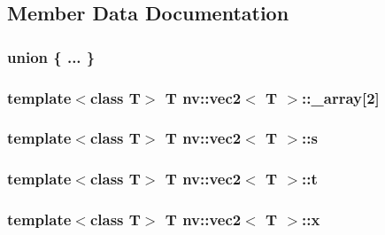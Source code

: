 \subsection{Member Data Documentation}
\hypertarget{classnv_1_1vec2_47919dfbe74f635507cd8ff2c33b06b6}{
\subsubsection[{"@7}]{\setlength{\rightskip}{0pt plus 5cm}union \{ ... \} }}
\label{classnv_1_1vec2_47919dfbe74f635507cd8ff2c33b06b6}


\hypertarget{classnv_1_1vec2_6bd8aa4685ee3e0b042c22572da5a3ff}{
\subsubsection[{\_\-array}]{\setlength{\rightskip}{0pt plus 5cm}template$<$class T$>$ T {\bf nv::vec2}$<$ T $>$::{\bf \_\-array}\mbox{[}2\mbox{]}}}
\label{classnv_1_1vec2_6bd8aa4685ee3e0b042c22572da5a3ff}


\hypertarget{classnv_1_1vec2_8654481c6586b16f5210f6cc0f04672e}{
\subsubsection[{s}]{\setlength{\rightskip}{0pt plus 5cm}template$<$class T$>$ T {\bf nv::vec2}$<$ T $>$::{\bf s}}}
\label{classnv_1_1vec2_8654481c6586b16f5210f6cc0f04672e}


\hypertarget{classnv_1_1vec2_6e3af4948e5eb30ffb805b88dd73cc91}{
\subsubsection[{t}]{\setlength{\rightskip}{0pt plus 5cm}template$<$class T$>$ T {\bf nv::vec2}$<$ T $>$::{\bf t}}}
\label{classnv_1_1vec2_6e3af4948e5eb30ffb805b88dd73cc91}


\hypertarget{classnv_1_1vec2_8efadb63b4a29541308b816916d1cb6f}{
\subsubsection[{x}]{\setlength{\rightskip}{0pt plus 5cm}template$<$class T$>$ T {\bf nv::vec2}$<$ T $>$::{\bf x}}}
\label{classnv_1_1vec2_8efadb63b4a29541308b816916d1cb6f}


